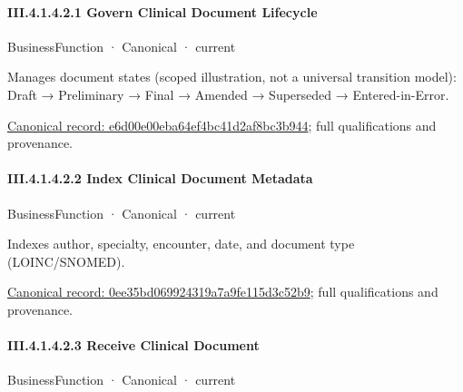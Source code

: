 \paragraph*{III.4.1.4.2.1 Govern Clinical Document Lifecycle}
\label{navigation:III.4.1.4.2.1}

\label{element:e6d00e00eba64ef4bc41d2af8bc3b944}
{\small BusinessFunction · Canonical · current}\par

Manages document states (scoped illustration, not a universal transition model): Draft → Preliminary → Final → Amended → Superseded → Entered-in-Error.


{\footnotesize \href{../../../../../../../continuum/business/business-function/e6d00e00eba64ef4bc41d2af8bc3b944.md}{Canonical record: e6d00e00eba64ef4bc41d2af8bc3b944}; full qualifications and provenance.}\par
\paragraph*{III.4.1.4.2.2 Index Clinical Document Metadata}
\label{navigation:III.4.1.4.2.2}

\label{element:0ee35bd069924319a7a9fe115d3c52b9}
{\small BusinessFunction · Canonical · current}\par

Indexes author, specialty, encounter, date, and document type (LOINC/SNOMED).


{\footnotesize \href{../../../../../../../continuum/business/business-function/0ee35bd069924319a7a9fe115d3c52b9.md}{Canonical record: 0ee35bd069924319a7a9fe115d3c52b9}; full qualifications and provenance.}\par
\paragraph*{III.4.1.4.2.3 Receive Clinical Document}
\label{navigation:III.4.1.4.2.3}

\label{element:d8f80ba3a5a9401b84e6476cbec8cace}
{\small BusinessFunction · Canonical · current}\par

